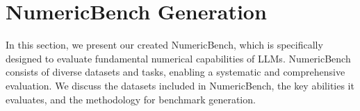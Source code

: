\section{NumericBench Generation}
In this section, we present our created  NumericBench, which is specifically designed to evaluate fundamental numerical capabilities of LLMs. 
NumericBench consists of diverse datasets and tasks, 
enabling a systematic and comprehensive evaluation.
We discuss the datasets included in NumericBench, the key abilities it evaluates, and the methodology for benchmark generation.

\begin{table*}[t]
	\caption{NumericBench statistics. R: contextual retrieval, C: comparison, S: summary, L: logical reasoning. The token count is calculated based on tiktoken, which is the tokenizer used by Llama3~\cite{grattafiori2024llama3herdmodels}. The sentences used for token calculation include both the context and the question.}
	\centering
	\renewcommand{\arraystretch}{1.15} %
	\setlength{\tabcolsep}{1.5pt} %
\end{table*}
